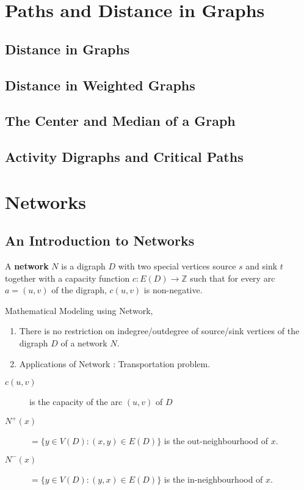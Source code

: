 \section{Paths and Distance in Graphs}
\subsection{Distance in Graphs}
\subsection{Distance in Weighted Graphs}
\subsection{The Center and Median of a Graph}
\subsection{Activity Digraphs and Critical Paths}

\section{Networks}
\subsection{An Introduction to Networks}
\begin{definition}
	A \textbf{network} $N$ is a digraph $D$ with two special vertices source $s$ and sink $t$ together with a capacity function $c : E(D) \to \mathbb{Z}$ such that for every arc $a = (u,v)$ of the digraph, $c(u,v)$ is non-negative.
\end{definition}

\begin{remark} Mathematical Modeling using Network,
	\begin{enumerate}
		\item There is no restriction on indegree/outdegree of source/sink vertices of the digraph $D$ of a network $N$.
		\item Applications of Network : Transportation problem.
	\end{enumerate}
\end{remark}

\begin{description}
	\item[$c(u,v)$] is the capacity of the arc $(u,v)$ of $D$
	\item[$N^+(x)$] $= \{ y \in V(D) : (x,y) \in E(D)\}$ is the out-neighbourhood of $x$.
	\item[$N^-(x)$] $= \{ y \in V(D) : (y,x) \in E(D)\}$ is the in-neighbourhood of $x$.
\end{description}

